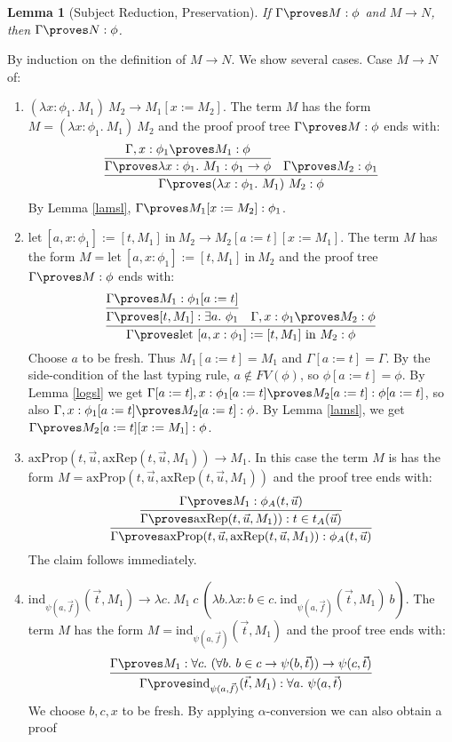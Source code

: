 \documentclass{LMCS}
\newtheorem{lemma}[thm]{Lemma}
\newcommand{\p}{\proves}
\newcommand{\g}{\Gamma}
\newcommand{\gp}{\Gamma \proves}
\newcommand{\pl}[1]{\ensuremath{\mathrm{#1}}}
\newcommand{\LET}{\pl{let}}
\newcommand{\IN}{\pl{in}}
\newcommand{\IND}{\pl{ind}}
\begin{document}
\begin{lemma}[Subject Reduction, Preservation]
If $\gp M : \phi$ and $M \to N$, then $\gp N : \phi$.
\end{lemma}
\proof By induction on the definition of $M \to N$. We show several cases. Case $M
\to N$ of:
\begin{enumerate}[$\bullet$]
\item $(\lambda x : \phi_1.\ M_1)\ M_2 \to M_1[x:=M_2]$. The term $M$ has
the form $M = (\lambda x : \phi_1.\ M_1)\ M_2$ and the proof 
proof tree $\gp M : \phi$ ends with:
\[
\infer{\gp (\lambda x : \phi_1.\ M_1)\ M_2 : \phi}
{
  \infer
  {
    \gp \lambda x : \phi_1.\ M_1 : \phi_1 \to \phi
  }
  {
    \g, x : \phi_1 \p M_1 : \phi
  }
  & 
  \gp M_2 : \phi_1
}
\]
By Lemma \ref{lamsl}, $\gp M_1[x:=M_2] : \phi_1$.
\item $\LET\ [a, x : \phi_1] := [t, M_1]\ \IN\ M_2 \to M_2[a:=t][x:=M_1]$.
The term $M$ has the form $M = \LET\ [a, x : \phi_1] := [t, M_1]\ \IN\ M_2$
and the proof tree $\gp M : \phi$ ends with:
\[
\infer
{\gp \LET\ [a, x : \phi_1] := [t, M_1]\ \IN\ M_2 : \phi}
{
  \infer{\gp [t, M_1] : \exists a.\ \phi_1}
  {\gp M_1 : \phi_1[a:=t]}
  & 
  \g, x : \phi_1 \proves M_2 : \phi
}
\]
Choose $a$ to be fresh. Thus $M_1[a:=t] = M_1$ and $\g[a:=t] = \g$. By the side-condition of the last
typing rule, $a \notin FV(\phi)$, so $\phi[a:=t] = \phi$. By Lemma
\ref{logsl} we get $\g[a:=t], x : \phi_1[a:=t] \p M_2[a:=t] : \phi[a:=t]$,
so also $\g, x : \phi_1[a:=t] \p M_2[a:=t] : \phi$. By Lemma \ref{lamsl}, we
get $\gp M_2[a:=t][x:=M_1] : \phi$.
\item $\pl{axProp}(t, \vec{u}, \pl{axRep}(t, \vec{u}, M_1)) \to M_1$. In this
case the term
$M$ is has the form  $M = \pl{axProp}(t, \vec{u}, \pl{axRep}(t, \vec{u},
M_1))$ and the proof tree ends with:
\[
\infer{\gp \pl{axProp}(t, \vec{u}, \pl{axRep}(t, \vec{u}, M_1)) : \phi_A(t, \vec{u})}
{
\infer{\gp \pl{axRep}(t, \vec{u}, M_1)) : t \in t_A(\vec{u})}{\gp M_1 :
\phi_A(t, \vec{u})}
}
\]
The claim follows immediately.
\item $\IND_{\psi(a, \vec{f})}(\vec{t}, M_1) \to \lambda c.\ M_1\ c\
(\lambda b. \lambda x : b \in c.\ \IND_{\psi(a, \vec{f})}(\vec{t},
M_1)\ b)$. The term $M$ has the form $M = \IND_{\psi(a,
\vec{f})}(\vec{t}, M_1)$ and the proof tree ends with:
\[
\infer{\gp \IND_{\psi(a, \vec{f})}(\vec{t}, M_1) : \forall a.\ \psi(a,
\vec{t})}{\gp M_1 : \forall c.\ (\forall b.\ b \in c \to \psi(b, \vec{t})) \to \psi(c, \vec{t})}
\]
We choose $b, c, x$ to be fresh. By applying $\alpha$-conversion we can also obtain a proof

\end{enumerate}
\end{document}
